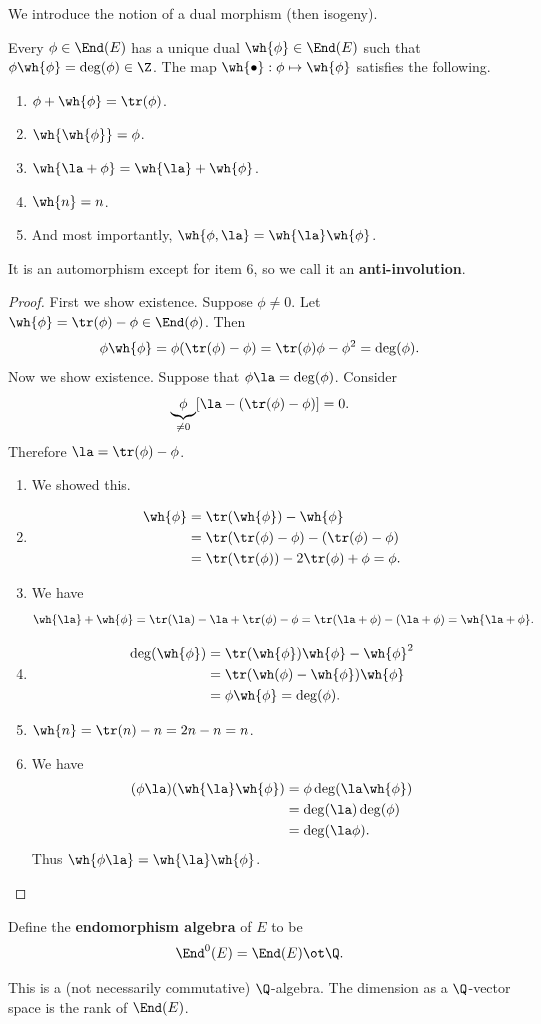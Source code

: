 We introduce the notion of a dual morphism (then isogeny). 
\begin{pr}
Every $\phi\in \End(E)$ has a unique dual $\wh{\phi}\in\End(E)$ such that $\phi\wh{\phi}=\deg(\phi)\in \Z$. The map $\wh{\bullet}:\phi\mapsto\wh{\phi}$ satisfies the following.
\begin{enumerate}
\item
$\phi+\wh{\phi}=\tr(\phi)$.
\item
$\wh{\wh{\phi}}=\phi$. 
\item
$\wh{\la+\phi}=\wh{\la}+\wh{\phi}$.
\item $\wh{n}=n$.
\item And most importantly, $\wh{\phi,\la}=\wh{\la}\wh{\phi}$.
\end{enumerate}
\end{pr}
It is an automorphism except for item 6, so we call it an \textbf{anti-involution}.
\begin{proof}
First we show existence. Suppose $\phi\ne 0$. Let $\wh{\phi}=\tr(\phi)-\phi\in \End(\phi)$. Then
\[
\phi\wh{\phi}=\phi(\tr(\phi)-\phi)=\tr(\phi)\phi-\phi^2=\deg(\phi).
\]
Now we show existence. Suppose that $\phi\la=\deg(\phi)$.  Consider 
\[\underbrace{\phi}_{\ne 0}[\la-(\tr(\phi)-\phi)]=0.\]
Therefore $\la=\tr(\phi)-\phi$.
\begin{enumerate}
\item
We showed this.
\item 
\begin{align*}
\wh{\phi}&=\tr(\wh{\phi})-\wh{\phi} \\
&=\tr(\tr(\phi)-\phi)-(\tr(\phi)-\phi)\\
&=\tr(\tr(\phi))-2\tr(\phi)+\phi=\phi.
\end{align*}
\item We have
\[
\wh{\la}+\wh{\phi}=\tr(\la)-\la+\tr(\phi)-\phi = \tr(\la+\phi)-(\la+\phi)=\wh{\la+\phi}.
\]
\item
\begin{align*}
\deg(\wh{\phi})&=\tr(\wh{\phi})\wh{\phi}-\wh{\phi}^2\\
&=\tr(\wh(\phi)-\wh{\phi})\wh{\phi}\\
&=\phi\wh{\phi}=\deg(\phi).
\end{align*}
\item
$\wh{n}=\tr(n)-n=2n-n=n$.
\item
We have
\begin{align*}
(\phi\la)(\wh{\la}\wh{\phi})
&=
\phi\deg(\la\wh{\phi})\\
&=
\deg(\la)\deg(\phi)\\
&=\deg(\la\phi).
\end{align*}
Thus $\wh{\phi\la}=\wh{\la}\wh{\phi}$.
\end{enumerate}
\end{proof}
\begin{df}
Define the \textbf{endomorphism algebra} of $E$ to be
\[
\End^0(E)=\End(E)\ot \Q.
\]
\end{df}
This is a (not necessarily commutative) $\Q$-algebra. The dimension as a $\Q$-vector space is the rank of $\End(E)$.

